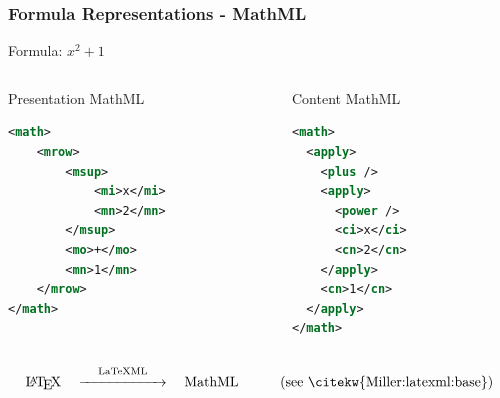\documentclass[usenames,dvipsnames,handout]{beamer}
\begin{document}
\begin{frame}[fragile]
    \frametitle{Formula Representations - MathML}
    Formula: $x^2 + 1$
    
    \vspace{2em}
    \begin{columns}[T]
        \begin{column}{0.4\textwidth}
            Presentation MathML
            \begin{lstlisting}[language=XML]
<math>
    <mrow>
        <msup>
            <mi>x</mi>
            <mn>2</mn>
        </msup>
        <mo>+</mo>
        <mn>1</mn>
    </mrow>
</math>
\end{lstlisting}
        \end{column}
        \begin{column}{0.4\textwidth}
            Content MathML
            \begin{lstlisting}[language=XML]
<math>
  <apply>
    <plus />
    <apply>
      <power />
      <ci>x</ci>
      <cn>2</cn>
    </apply>
    <cn>1</cn>
  </apply>
</math>
\end{lstlisting}

        \end{column}
    \end{columns}

    \pause
    \vspace{2em}
    $$ \text{\LaTeX} \quad \stackrel{\text{LaTeXML}}{\xrightarrow{\hspace*{2cm}}} \quad \text{MathML}\quad\quad\quad\text{(see  \citekw{Miller:latexml:base})}$$
\end{frame}

\end{document}
